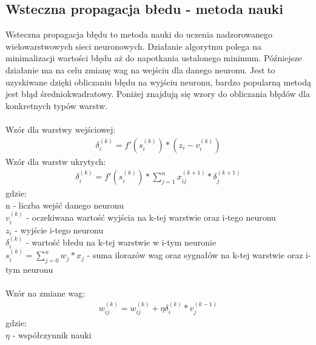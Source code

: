 \documentclass{classrep}
\begin{document}
{        \subsection{Wsteczna propagacja błedu - metoda nauki}
        {
            Wsteczna propagacja błędu to metoda nauki do uczenia nadzorowanego wielowarstwowych
            sieci neuronowych. Działanie algorytmu polega na minimalizacji wartości błędu aż
            do napotkania ustalonego minimum. Późniejsze działanie ma na celu zmianę wag na
            wejściu dla danego neuronu. Jest to uzyskiwane dzięki obliczaniu błędu na wyjściu
            neuronu, bardzo popularną metodą jest błąd średniokwadratowy. Poniżej znajdują się
            wzory do obliczania błędów dla konkretnych typów warstw.\\\\
            Wzór dla warstwy wejściowej:
            \begin{align*}
                \delta_i^{(k)}=f'(s_i^{(k)})*(z_i-v_i^{(k)})
            \end{align*}
            Wzór dla warstw ukrytych:
            \begin{align*}
                \delta_i^{(k)}=f'(s_i^{(k)})*\sum_{j=1}^{n} {x_{ij}^{(k+1)}*\delta_j^{(k+1)}}
            \end{align*}
            gdzie:\\
            n - liczba wejść danego neuronu\\
            $v_i^{(k)}$ - oczekiwana wartość wyjścia na k-tej warstwie oraz i-tego neuronu\\
            $z_i$ - wyjście i-tego neuronu\\
            $\delta_i^{(k)}$ - wartość błedu na k-tej warstwie w i-tym neuronie\\
            $s_i^{(k)}=\sum_{j=0}^{n} {w_j * x_j}$ - suma ilorazów wag oraz sygnałów
        na k-tej warstwie oraz i-tym neuronu\\\\
            Wzór na zmiane wag:
            \begin{align*}
                w_{ij}^{(k)}= w_{ij}^{(k)}+\eta\delta_i^{(k)}*v_j^{(k-1)}
            \end{align*}
            gdzie:\\
            $\eta$ - współczynnik nauki
        }
}
\end{document}

